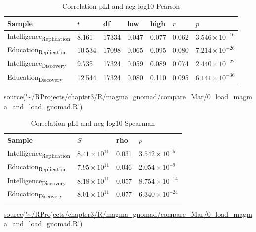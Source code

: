 
\begin{table}[ht]
\centering
\setlength{\extrarowheight}{2pt}
\begin{tabular}{lllllll}
  \toprule
Sample & $t$ & df & low & high & $r$ & $p$ \\ 
\midrule
Intelligence\textsubscript{Replication} & 8.161 & 17334 & 0.047 & 0.077 & 0.062 & $3.546 \times 10^{-16}$ \\ 
  Education\textsubscript{Replication} & 10.534 & 17098 & 0.065 & 0.095 & 0.080 & $7.214 \times 10^{-26}$ \\ 
  Intelligence\textsubscript{Discovery} & 9.735 & 17324 & 0.059 & 0.089 & 0.074 & $2.440 \times 10^{-22}$ \\ 
  Education\textsubscript{Discovery} & 12.544 & 17324 & 0.080 & 0.110 & 0.095 & $6.141 \times 10^{-36}$ \\ 
   \bottomrule
\end{tabular}
\caption{Correlation pLI and neg log10 Pearson } 
\tiny\url{source('~/RProjects/chapter3/R/magma_gnomad/compare_Mar/0_load_magma_and_load_gnomad.R')}
\label{tab: Correlation pLI and neg log10 Pearson}
\end{table}




\begin{table}[ht]
\centering
\setlength{\extrarowheight}{2pt}
\begin{tabular}{llll}
  \toprule
Sample & $S$ & rho & $p$ \\ 
  \midrule
Intelligence\textsubscript{Replication} & $8.41 \times 10^{11}$ & 0.031 & $3.542 \times 10^{-5}$ \\ 
  Education\textsubscript{Replication} & $7.95 \times 10^{11}$ & 0.046 & $2.054 \times 10^{-9}$ \\ 
  Intelligence\textsubscript{Discovery} & $8.18 \times 10^{11}$ & 0.057 & $8.754 \times 10^{-14}$ \\ 
  Education\textsubscript{Discovery} & $8.01 \times 10^{11}$ & 0.077 & $6.340 \times 10^{-24}$ \\ 
   \bottomrule
\end{tabular}
\caption{Correlation pLI and neg log10 Spearman } 
\tiny\url{source('~/RProjects/chapter3/R/magma_gnomad/compare_Mar/0_load_magma_and_load_gnomad.R')}
\label{tab: Correlation pLI and neg log10 Spearman}
\end{table}




